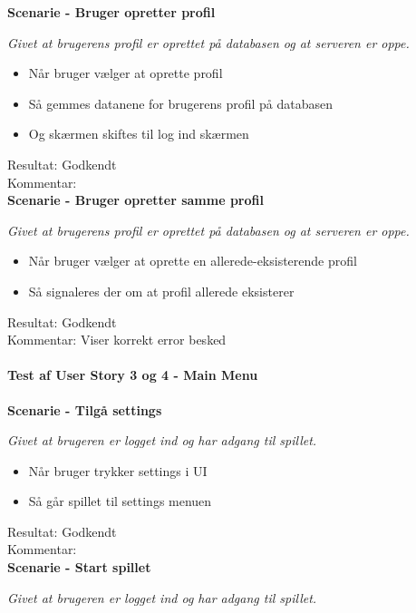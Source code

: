 \bf{Scenarie - Bruger opretter profil}

\it{Givet at brugerens profil er oprettet på databasen og at serveren er oppe.}

\begin{itemize}
  \item Når bruger vælger at oprette profil
  \item Så gemmes datanene for brugerens profil på databasen
  \item Og skærmen skiftes til log ind skærmen
\end{itemize}

Resultat: Godkendt\\
Kommentar:\\

\bf{Scenarie - Bruger opretter samme profil}

\it{Givet at brugerens profil er oprettet på databasen og at serveren er oppe.}

\begin{itemize}
  \item Når bruger vælger at oprette en allerede-eksisterende profil
  \item Så signaleres der om at profil allerede eksisterer
\end{itemize}

Resultat: Godkendt\\
Kommentar: Viser korrekt error besked\\

\paragraph{Test af User Story 3 og 4 - Main Menu}

\bf{Scenarie - Tilgå settings}

\it{Givet at brugeren er logget ind og har adgang til spillet.}

\begin{itemize}
  \item Når bruger trykker settings i UI
  \item Så går spillet til settings menuen
\end{itemize}

Resultat: Godkendt\\
Kommentar:\\

\bf{Scenarie - Start spillet}

\it{Givet at brugeren er logget ind og har adgang til spillet.}

